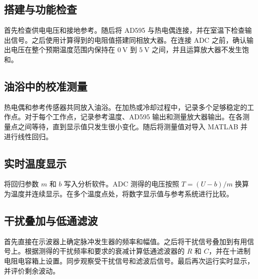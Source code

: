 \subsection{搭建与功能检查}

首先检查供电电压和接地参考。随后将 AD595 与热电偶连接，并在室温下检查输出信号。之后使用计算得到的电阻值搭建同相放大器。在连接 ADC 之前，确认输出电压在整个预期温度范围内保持在 $\SI{0}{\volt}$ 到 $\SI{5}{\volt}$ 之间，并且运算放大器不发生饱和。

\subsection{油浴中的校准测量}

热电偶和参考传感器共同放入油浴。在加热或冷却过程中，记录多个足够稳定的工作点。对于每个工作点，记录参考温度、AD595 输出和测量放大器输出。在各测量点之间等待，直到显示值只发生很小变化。随后将测量值对导入 MATLAB 并进行线性回归。

\subsection{实时温度显示}

将回归参数 $m$ 和 $b$ 写入分析软件。ADC 测得的电压按照 $T = (U - b)/m$ 换算为温度并连续显示。在多个温度点处，将数字显示值与参考系统进行比较。

\subsection{干扰叠加与低通滤波}

首先直接在示波器上确定脉冲发生器的频率和幅值。之后将干扰信号叠加到有用信号上。根据测得的干扰频率和要求的衰减计算低通滤波器的 $R$ 和 $C$，并在十进制电阻电容箱上设置。同步观察受干扰信号和滤波后信号。最后再次运行实时显示，并评价剩余波动。
